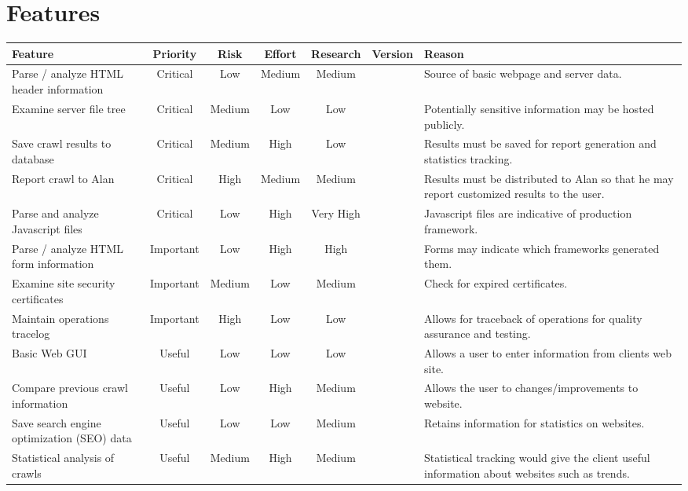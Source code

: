 \section{Features}

\newcommand{\lw}{Low}
\newcommand{\md}{Medium}
\newcommand{\hh}{High}

\begin{tabularx}{\textwidth}{|X|c|c|c|c|c|X|}
	\hline
	\bf Feature &\bf Priority &\bf Risk &\bf Effort &\bf Research &\bf Version &\bf Reason \\ \hline
	Parse / analyze HTML header information & Critical & \lw & \md & \md &  & Source of basic webpage and server data. \\ \hline
	Examine server file tree & Critical & \md & \lw & \lw & & Potentially sensitive information may be hosted publicly. \\ \hline
	Save crawl results to database & Critical & \md & \hh & \lw & & Results must be saved for report generation and statistics tracking. \\ \hline
	Report crawl to Alan & Critical & \hh & \md & \md & & Results must be distributed to Alan so that he may report customized results to the user. \\ \hline
	Parse and analyze Javascript files & Critical & \lw & \hh & Very High & & Javascript files are indicative of production framework. \\ \hline
	Parse / analyze HTML form information & Important & \lw & \hh & \hh &  & Forms may indicate which frameworks generated them. \\ \hline
	Examine site security certificates & Important & \md & \lw & \md & & Check for expired certificates. \\ \hline
	Maintain operations tracelog & Important & \hh & \lw & \lw & & Allows for traceback of operations for quality assurance and testing. \\ \hline
	Basic Web GUI & Useful & \lw & \lw & \lw & & Allows a user to enter information from clients web site. \\ \hline
	Compare previous crawl information & Useful & \lw & \hh & \md & & Allows the user to changes/improvements to website. \\ \hline
	Save search engine optimization (SEO) data & Useful & \lw & \lw & \md & & Retains information for statistics on websites. \\ \hline
	Statistical analysis of crawls & Useful & \md & \hh & \md & & Statistical tracking would give the client useful information about websites such as trends. \\ \hline
\end{tabularx}